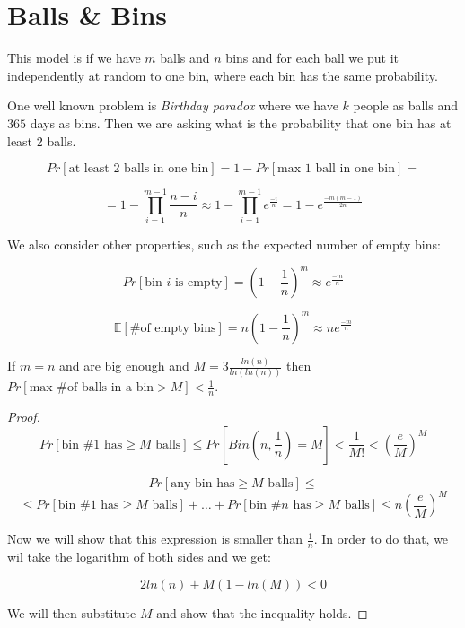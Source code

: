 \chapter{Balls \& Bins}

This model is if we have $m$ balls and $n$ bins and for each ball we put it independently at random to one bin, where each bin has the same probability.

One well known problem is \textit{Birthday paradox} where we have $k$ people as balls and $365$ days as bins. Then we are asking what is the probability that one bin has at least 2 balls.

$$
Pr[\text{at least 2 balls in one bin}] = 1 - Pr[\text{max 1 ball in one bin}] =
$$

$$
= 1 - \prod_{i=1}^{m-1} \frac{n-i}{n} \approx 1 - \prod_{i=1}^{m-1} e^{\frac{-i}{n}} = 1 - e^{\frac{-m(m-1)}{2n}}
$$

We also consider other properties, such as the expected number of empty bins:

$$
Pr[\text{bin } i \text{ is empty}] = (1 - \frac{1}{n})^{m} \approx e^{\frac{-m}{n}}
$$

$$
\mathbb{E}[ \text{\# of empty bins}] = n (1- \frac{1}{n})^{m} \approx n e^{\frac{-m}{n}}
$$

\begin{thm}
	If $m=n$ and are big enough and $M = 3 \frac{ln(n)}{ln(ln(n))}$ then $Pr[\text{max \# of balls in a bin} > M] < \frac{1}{n}$.
\end{thm}

\begin{proof}
	
	$$
	Pr[\text{bin } \#1 \text{ has} \geq M \text{ balls} ]  \leq Pr[Bin(n, \frac{1}{n}) = M] < \frac{1}{M!} < (\frac{e}{M})^M
	$$
	
	$$
	Pr[\text{any bin has} \geq M \text{ balls} ] \leq 
	$$
	$$
	\leq Pr[\text{bin } \#1 \text{ has} \geq M \text{ balls} ] + \dots + Pr[\text{bin } \#n \text{ has} \geq M \text{ balls} ] \leq n (\frac{e}{M})^M
	$$
	
	Now we will show that this expression is smaller than $\frac{1}{n}$. In order to do that, we wil take the logarithm of both sides and we get:
	
	$$
	2ln(n) + M(1-ln(M)) < 0
	$$
	
	We will then substitute $M$ and show that the inequality holds.
\end{proof}


